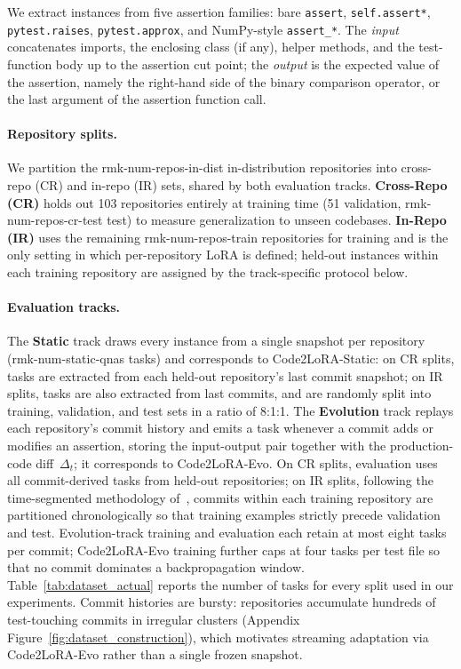 \documentclass[11pt]{article}
\newcommand{\UseMacro}[1]{\csname rmk-#1\endcsname}
\newcommand{\codelora}{Code2LoRA\xspace}
\newcommand{\codelorastatic}{\codelora-Static\xspace}
\newcommand{\codeloraevo}{\codelora-Evo\xspace}
\begin{document}
We extract instances from five assertion families: bare \texttt{assert}, \texttt{self.assert*}, \texttt{pytest.raises}, \texttt{pytest.approx}, and NumPy-style \texttt{assert\_*}.
The \emph{input} concatenates imports, the enclosing class (if any), helper methods, and the test-function body up to the assertion cut point;
the \emph{output} is the expected value of the assertion, namely the right-hand side of the binary comparison operator, or the last argument of the assertion function call.

\paragraph{Repository splits.}
\label{sec:benchmark:splits}
We partition the \UseMacro{num-repos-in-dist} in-distribution repositories into cross-repo (CR) and in-repo (IR) sets, shared by both evaluation tracks.
\textbf{Cross-Repo (CR)} holds out 103 repositories entirely at training time (51 validation, \UseMacro{num-repos-cr-test} test) to measure generalization to unseen codebases.
\textbf{In-Repo (IR)} uses the remaining \UseMacro{num-repos-train} repositories for training and is the only setting in which per-repository LoRA is defined; held-out instances within each training repository are assigned by the track-specific protocol below.

\paragraph{Evaluation tracks.}
\label{sec:benchmark:tracks}
\label{sec:benchmark:evolution}
The \textbf{Static} track draws every instance from a single snapshot per repository (\UseMacro{num-static-qnas} tasks) and corresponds to \codelorastatic{}:
on CR splits, tasks are extracted from each held-out repository's last commit snapshot;
on IR splits, tasks are also extracted from last commits, and are randomly split into training, validation, and test sets in a ratio of 8:1:1.
The \textbf{Evolution} track replays each repository's commit history and emits a task whenever a commit adds or modifies an assertion, storing the input-output pair together with the production-code diff~$\Delta_t$; it corresponds to \codeloraevo{}.
On CR splits, evaluation uses all commit-derived tasks from held-out repositories;
on IR splits, following the time-segmented methodology of~\citet{nie2022impact}, commits within each training repository are partitioned chronologically so that training examples strictly precede validation and test.
Evolution-track training and evaluation each retain at most eight tasks per commit; \codeloraevo{} training further caps at four tasks per test file so that no commit dominates a backpropagation window.
Table~\ref{tab:dataset_actual} reports the number of tasks for every split used in our experiments.
Commit histories are bursty: repositories accumulate hundreds of test-touching commits in irregular clusters (Appendix Figure~\ref{fig:dataset_construction}), which motivates streaming adaptation via \codeloraevo{} rather than a single frozen snapshot.
\end{document}
